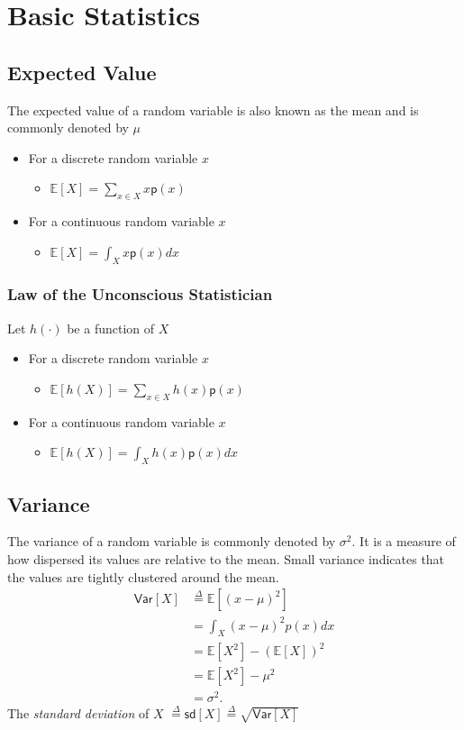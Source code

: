 \documentclass[twoside]{article}
\def\defn{\stackrel{\Delta}{=}} %
\def\p{\textsf{p}} %
\def\sd{\textsf{sd}} %
\def\Var{\textsf{Var}} %
\begin{document}
\section{Basic Statistics}

\subsection*{Expected Value}

The expected value of a random variable is also known as the mean and is commonly denoted by $\mu$
\begin{itemize}
\item For a discrete random variable $x$
  \begin{itemize}
    \item[] $\mathbb{E}[X] = \sum_{x \in X} x\p(x)$
  \end{itemize}
\item For a continuous random variable $x$
  \begin{itemize}
    \item[] $\mathbb{E}[X] = \int_{X} x\p(x)dx$
  \end{itemize}
\end{itemize}

\subsubsection*{Law of the Unconscious Statistician}
Let $h(\cdot)$ be a function of $X$
\begin{itemize}
\item For a discrete random variable $x$
  \begin{itemize}
    \item[] $\mathbb{E}[h(X)] = \sum_{x \in X} h(x)\p(x)$
  \end{itemize}
\item For a continuous random variable $x$
  \begin{itemize}
    \item[] $\mathbb{E}[h(X)] = \int_{X} h(x)\p(x)dx$
  \end{itemize}
\end{itemize} 
\subsection*{Variance}

The variance of a random variable is commonly denoted by $\sigma^2$. It is a measure of how dispersed its values are relative to the mean. Small variance indicates that the values are tightly clustered around the mean. %
\begin{align*}
\Var[X] &\defn \mathbb{E}[(x-\mu)^2]\\
&= \int_{X} (x-\mu)^{2}p(x)dx\\
&=\mathbb{E}[X^2]-(\mathbb{E}[X])^2\\
&=\mathbb{E}[X^2] - \mu^{2}\\
& = \sigma^2.
\end{align*}
The \emph{standard deviation} of $X$ $\defn \sd[X] \defn \sqrt{\Var[X]}$
\end{document}

